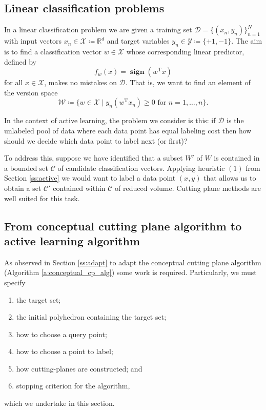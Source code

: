 \documentclass[11pt]{amsart}
\theoremstyle{definition}
\theoremstyle{remark}
\newcommand{\transpose}{\text{T}}
\DeclareMathOperator{\sign}{\textbf{sign}}
\begin{document}
    \subsection{Linear classification problems}\label{ss:classification}
        In a linear classification problem we are given a training set $\mathcal{D} = \{(x_n, y_n)\}_{n=1}^N$ with input vectors $x_n \in \mathcal{X} \coloneqq \mathbb{R}^d$ and target variables $y_n \in \mathcal{Y} \coloneqq \{+1, -1\}$. The aim is to find a classification vector $w \in \mathcal{X}$ whose corresponding linear predictor, defined by
        \begin{equation*}
            f_w(x) = \sign(w^\transpose x) 
        \end{equation*}
        for all $x \in \mathcal{X}$, makes no mistakes on $\mathcal{D}$. That is, we want to find an element of the version space
        \begin{equation*}
            \mathcal{W} \coloneqq \{ w \in \mathcal{X} \;|\; y_n (w^\transpose x_n) \geq 0 \text{ for $n = 1, \dots, n$}\}.
        \end{equation*}

        In the context of active learning, the problem we consider is this: if $\mathcal{D}$ is the unlabeled pool of data where each data point has equal labeling cost then how should we decide which data point to label next (or first)? 

        To address this, suppose we have identified that a subset $W'$ of $W$ is contained in a bounded set $\mathcal{C}$ of candidate classification vectors. Applying heuristic $(1)$ from Section \ref{ss:active} we would want to label a data point $(x, y)$ that allows us to obtain a set $\mathcal{C}'$ contained within $\mathcal{C}$ of reduced volume. Cutting plane methods are well suited for this task.
    
    \subsection{From conceptual cutting plane algorithm to active learning algorithm}
        As observed in Section \ref{ss:adapt} to adapt the conceptual cutting plane algorithm (Algorithm \ref{a:conceptual_cp_alg}) some work is required. Particularly, we must specify
        \begin{enumerate}
            \item the target set;
            \item the initial polyhedron containing the target set;
            \item how to choose a query point;
            \item how to choose a point to label;
            \item how cutting-planes are constructed; and 
            \item stopping criterion for the algorithm,
        \end{enumerate}
        which we undertake in this section. 
\end{document}
